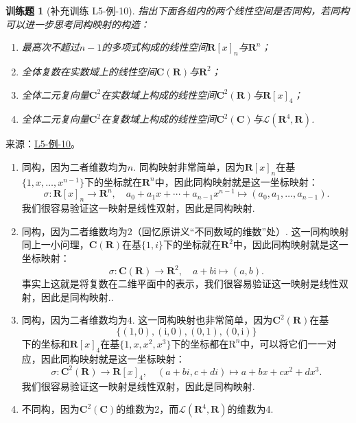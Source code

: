 \documentclass[12pt,fontset=fandol]{ctexart}
\newtheorem{exercise}{训练题}[section]
\begin{document}
\begin{exercise}[补充训练 L5-例-10]\label{prob:L5-例-10}
指出下面各组内的两个线性空间是否同构，若同构可以进一步思考同构映射的构造：
    \begin{enumerate}
        \item 最高次不超过$n-1$的多项式构成的线性空间$\mathbf{R}[x]_n$与$\mathbf{R}^n$；

        \item 全体复数在实数域上的线性空间$\mathbf{C}(\mathbf{R})$与$\mathbf{R}^2$；

        \item 全体二元复向量$\mathbf{C}^2$在实数域上构成的线性空间$\mathbf{C}^2(\mathbf{R})$与$\mathbf{R}[x]_4$；

        \item 全体二元复向量$\mathbf{C}^2$在复数域上构成的线性空间$\mathbf{C}^2(\mathbf{C})$与$\mathcal{L}(\mathbf{R}^4,\mathbf{R})$.
    \end{enumerate}
\end{exercise}
\noindent 来源：\href{https://github.com/yhwu-is/Linear-Algebra-Left-Undone/blob/new/%E8%AE%B2%E4%B9%89/%E4%B8%93%E9%A2%98/5%20%E7%BA%BF%E6%80%A7%E6%98%A0%E5%B0%84.tex}{L5-例-10}。
\begin{solve}
\begin{enumerate}
        \item 同构，因为二者维数均为$n$. 同构映射非常简单，因为$\mathbf{R}[x]_n$在基$\{1,x,\ldots,x^{n-1}\}$下的坐标就在$\mathbf{R}^n$中，因此同构映射就是这一坐标映射：
              \[\sigma:\mathbf{R}[x]_n\to\mathbf{R}^n,\quad a_0+a_1x+\cdots+a_{n-1}x^{n-1}\mapsto(a_0,a_1,\ldots,a_{n-1}).\]
              我们很容易验证这一映射是线性双射，因此是同构映射.

        \item 同构，因为二者维数均为2（回忆原讲义“不同数域的维数”处）. 这一同构映射同上一小问理，$\mathbf{C}(\mathbf{R})$在基$\{1,i\}$下的坐标就在$\mathbf{R}^2$中，因此同构映射就是这一坐标映射：
              \[\sigma:\mathbf{C}(\mathbf{R})\to\mathbf{R}^2,\quad a+b\mathrm{i}\mapsto(a,b).\]
              事实上这就是将复数在二维平面中的表示，我们很容易验证这一映射是线性双射，因此是同构映射..

        \item 同构，因为二者维数均为4. 这一同构映射也非常简单，因为$\mathbf{C}^2(\mathbf{R})$在基
              \[\{(1,0),(\mathrm{i},0),(0,1),(0,\mathrm{i})\}\]
              下的坐标和$\mathbf{R}[x]_4$在基$\{1,x,x^2,x^3\}$下的坐标都在$\mathrm{R}^n$中，可以将它们一一对应，因此同构映射就是这一坐标映射：
              \[\sigma:\mathbf{C}^2(\mathbf{R})\to\mathbf{R}[x]_4,\quad (a+bi,c+di)\mapsto a+bx+cx^2+dx^3.\]
              我们很容易验证这一映射是线性双射，因此是同构映射.

        \item 不同构，因为$\mathbf{C}^2(\mathbf{C})$的维数为2，而$\mathcal{L}(\mathbf{R}^4,\mathbf{R})$的维数为4.
    \end{enumerate}
\end{solve}
\end{document}
